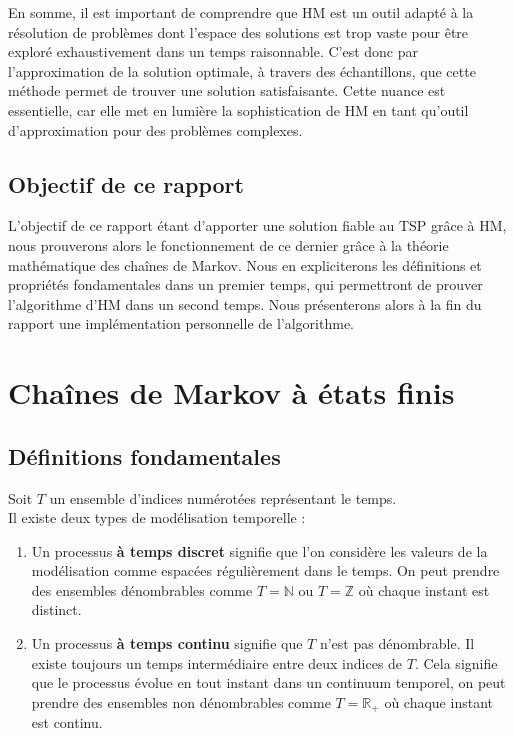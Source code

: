 \documentclass{article}
\begin{document}
En somme, il est important de comprendre que HM est un outil adapté à la résolution de problèmes dont l'espace des solutions est trop vaste pour être exploré exhaustivement dans un temps raisonnable. C'est donc par l'approximation de la solution optimale, à travers des échantillons, que cette méthode permet de trouver une solution satisfaisante.
Cette nuance est essentielle, car elle met en lumière la sophistication de HM en tant qu'outil d'approximation pour des problèmes complexes.

\subsection{Objectif de ce rapport}

L'objectif de ce rapport étant d'apporter une solution fiable au TSP grâce à HM, nous prouverons alors le fonctionnement de ce dernier grâce à la théorie mathématique des chaînes de Markov. Nous en expliciterons les définitions et propriétés fondamentales dans un premier temps, qui permettront de prouver l'algorithme d'HM dans un second temps. Nous présenterons alors à la fin du rapport une implémentation personnelle de l'algorithme.

\section{Chaînes de Markov à états finis}

\subsection{Définitions fondamentales}

\begin{tcolorbox}[colback=white,colframe=blue!80!black,title=Temps Discret et Temps Continu]
Soit $T$ un ensemble d'indices numérotées représentant le temps. \\

Il existe deux types de modélisation temporelle :
\begin{enumerate}[leftmargin=5em, label=(\arabic*)]
    \item Un processus \textbf{à temps discret} signifie que l'on considère les valeurs de la modélisation comme espacées régulièrement dans le temps.
          On peut prendre des ensembles dénombrables comme $T = \mathbb{N}$ ou $T = \mathbb{Z}$ où chaque instant est distinct.
    \item Un processus \textbf{à temps continu} signifie que $T$ n'est pas dénombrable. Il existe toujours un temps intermédiaire entre deux indices de $T$.
          Cela signifie que le processus évolue en tout instant dans un continuum temporel, on peut prendre des ensembles non dénombrables comme $T = \mathbb{R}_+$ où chaque instant est continu.
\end{enumerate}
\end{tcolorbox}
\end{document}
